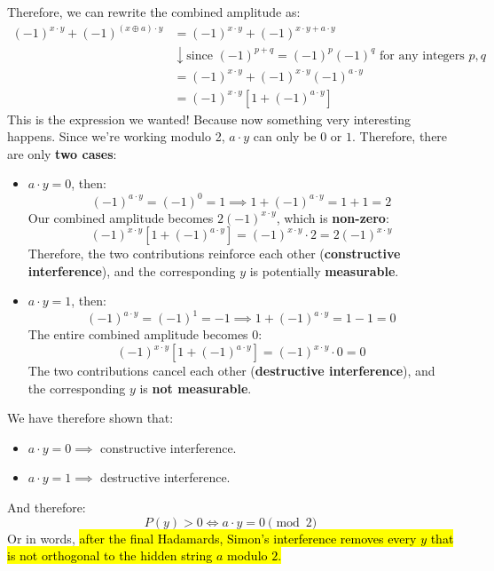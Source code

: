 \noindent
Therefore, we can rewrite the combined amplitude as:
\begin{align*}
    (-1)^{x \cdot y} + (-1)^{(x\oplus a) \cdot y}
    &= (-1)^{x \cdot y} + (-1)^{x \cdot y + a \cdot y} \\[.3em]
    &\downarrow \text{since } (-1)^{p+q} = (-1)^p(-1)^q \text{ for any integers } p,q \\[.3em]
    &= (-1)^{x \cdot y} + (-1)^{x \cdot y}(-1)^{a \cdot y} \\[.3em]
    &= (-1)^{x \cdot y} \left[1 + (-1)^{a \cdot y}\right]
\end{align*}
This is the expression we wanted! Because now something very interesting happens. Since we're working modulo 2, $a \cdot y$ can only be $0$ or $1$. Therefore, there are only \textbf{two cases}:
\begin{itemize}
    \item $a \cdot y = 0$, then:
        \begin{equation*}
            (-1)^{a \cdot y} = (-1)^0 = 1 \implies 1 + (-1)^{a \cdot y} = 1 + 1 = 2
        \end{equation*}
        Our combined amplitude becomes $2(-1)^{x \cdot y}$, which is \textbf{non-zero}:
        \begin{equation*}
            (-1)^{x \cdot y} \left[1 + (-1)^{a \cdot y}\right] = (-1)^{x \cdot y} \cdot 2 = 2(-1)^{x \cdot y}
        \end{equation*}
        Therefore, the two contributions reinforce each other (\textbf{constructive interference}), and the corresponding $y$ is potentially \textbf{measurable}.

    \item $a \cdot y = 1$, then:
        \begin{equation*}
            (-1)^{a \cdot y} = (-1)^1 = -1 \implies 1 + (-1)^{a \cdot y} = 1 - 1 = 0
        \end{equation*}
        The entire combined amplitude becomes $0$:
        \begin{equation*}
            (-1)^{x \cdot y} \left[1 + (-1)^{a \cdot y}\right] = (-1)^{x \cdot y} \cdot 0 = 0
        \end{equation*}
        The two contributions cancel each other (\textbf{destructive interference}), and the corresponding $y$ is \textbf{not measurable}.
\end{itemize}
We have therefore shown that:
\begin{itemize}
    \item $a \cdot y = 0 \implies$ constructive interference.
    \item $a \cdot y = 1 \implies$ destructive interference.
\end{itemize}
And therefore:
\begin{equation*}
    P(y) > 0 \iff a \cdot y = 0 \pmod 2
\end{equation*}
Or in words, \hl{after the final Hadamards, Simon's interference removes every $y$ that is not orthogonal to the hidden string $a$ modulo $2$.}

